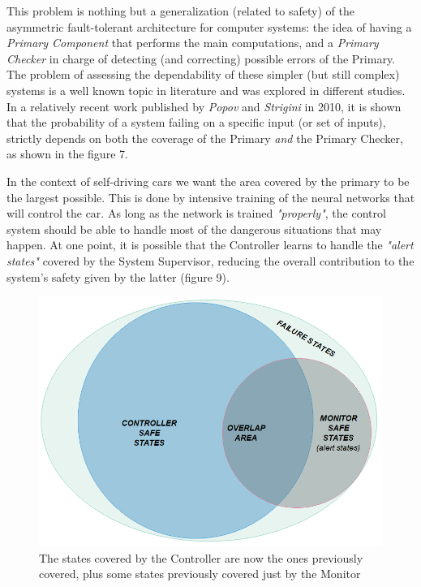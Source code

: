This problem is nothing but a generalization (related to safety) of the asymmetric fault-tolerant architecture for computer systems: the idea of having a \textsl{Primary Component} that performs the main computations, and a \textsl{Primary Checker} in charge of detecting (and correcting) possible errors of the Primary.\newline
The problem of assessing the dependability of these simpler (but still complex) systems is a well known topic in literature and was explored in different studies. In a relatively recent work published by \textsl{Popov} and \textsl{Strigini} in 2010, it is shown that the probability of a system failing on a specific input (or set of inputs), strictly depends on both the coverage of the Primary \textsl{and} the Primary Checker, as shown in the figure 7.\cite{striginiPopov}

In the context of self-driving cars we want the area covered by the primary to be the largest possible. This is done by intensive training of the neural networks that will control the car. As long as the network is trained \textsl{"properly"}, the control system should be able to handle most of the dangerous situations that may happen. At one point, it is possible that the Controller learns to handle the \textsl{"alert states"} covered by the System Supervisor, reducing the overall contribution to the system's safety given by the latter (figure 9).\newpage

\begin{figure}[h!]
	\includegraphics[width=\textwidth]{img/area-growth-good.png}
	\caption{The states covered by the Controller are now the ones previously covered, plus some states previously covered just by the Monitor}
\end{figure}

